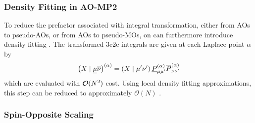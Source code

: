 
\subsubsection{Density Fitting in AO-MP2}

To reduce the prefactor associated with integral transformation, either from AOs to pseudo-AOs, or from AOs to pseudo-MOs, on can furthermore introduce density fitting \cite{Zie2009,Mau2014}. The transformed 3c2e integrals are given at each Laplace point $\alpha$ by
\begin{equation}
\left( X \mid \underline{\mu}\overline{\nu} \right)^{(\alpha)} = \left( X \mid \mu'\nu' \right) \underline{P}^{(\alpha)}_{\mu\mu'} \overline{P}^{(\alpha)}_{\nu\nu'}  
\end{equation}
\noindent which are evaluated with $\mathcal{O}(N^{2})$ cost. Using local density fitting approximations, this step can be reduced to approximately $\mathcal{O}(N)$ \cite{Gla2020}.

\subsubsection{Spin-Opposite Scaling}


